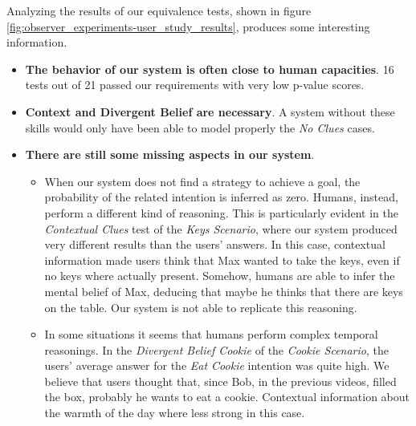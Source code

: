 Analyzing the results of our equivalence tests, shown in figure \ref{fig:observer_experiments-user_study_results}, produces some interesting information.
\begin{itemize}
\item \textbf{The behavior of our system is often close to human capacities}. 16 tests out of 21 passed our requirements   with very low p-value scores. 
\item \textbf{Context and Divergent Belief are necessary}. A system without these skills would only have been able to model properly the \textit{No Clues} cases. 
\item \textbf{There are still some missing aspects in our system}. 
	\begin{itemize}
		\item When our system does not find a strategy to achieve a goal, the probability of the related intention is inferred as zero. Humans, instead, perform a different kind of reasoning. This is particularly evident in the \textit{Contextual Clues} test of the \textit{Keys Scenario}, where our system produced very different results than the users' answers. In this case, contextual information made users think that Max wanted to take the keys, even if no keys where actually present. Somehow, humans are able to infer the mental belief of Max, deducing that maybe he thinks that there are keys on the table. Our system is not able to replicate this reasoning.
		\item In some situations it seems that humans perform complex temporal reasonings. In the \textit{Divergent Belief Cookie} of the \textit{Cookie Scenario}, the users' average answer for the \textit{Eat Cookie} intention was quite high. We believe that users thought that, since Bob, in the previous videos, filled the box, probably he wants to eat a cookie. Contextual information about the warmth of the day where less strong in this case. 
	\end{itemize}

\end{itemize}
